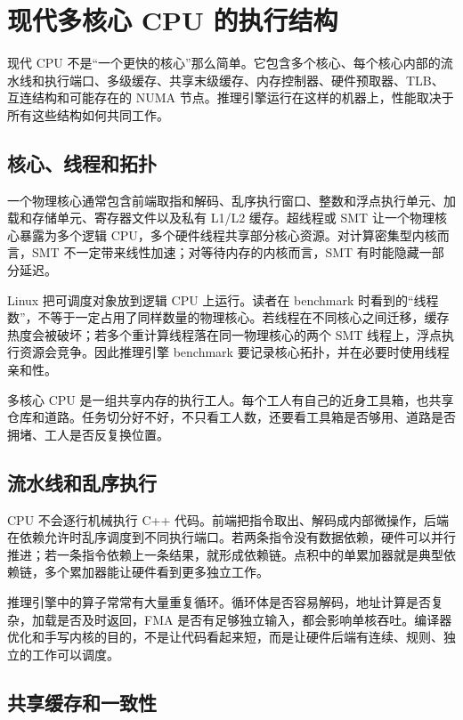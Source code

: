\chapter{现代多核心 CPU 的执行结构}

现代 CPU 不是“一个更快的核心”那么简单。它包含多个核心、每个核心内部的流水线和执行端口、多级缓存、共享末级缓存、内存控制器、硬件预取器、TLB、互连结构和可能存在的 NUMA 节点。推理引擎运行在这样的机器上，性能取决于所有这些结构如何共同工作。

\section{核心、线程和拓扑}

一个物理核心通常包含前端取指和解码、乱序执行窗口、整数和浮点执行单元、加载和存储单元、寄存器文件以及私有 L1/L2 缓存。超线程或 SMT 让一个物理核心暴露为多个逻辑 CPU，多个硬件线程共享部分核心资源。对计算密集型内核而言，SMT 不一定带来线性加速；对等待内存的内核而言，SMT 有时能隐藏一部分延迟。

Linux 把可调度对象放到逻辑 CPU 上运行。读者在 benchmark 时看到的“线程数”，不等于一定占用了同样数量的物理核心。若线程在不同核心之间迁移，缓存热度会被破坏；若多个重计算线程落在同一物理核心的两个 SMT 线程上，浮点执行资源会竞争。因此推理引擎 benchmark 要记录核心拓扑，并在必要时使用线程亲和性。

\begin{mentalmodel}
多核心 CPU 是一组共享内存的执行工人。每个工人有自己的近身工具箱，也共享仓库和道路。任务切分好不好，不只看工人数，还要看工具箱是否够用、道路是否拥堵、工人是否反复换位置。
\end{mentalmodel}

\section{流水线和乱序执行}

CPU 不会逐行机械执行 C++ 代码。前端把指令取出、解码成内部微操作，后端在依赖允许时乱序调度到不同执行端口。若两条指令没有数据依赖，硬件可以并行推进；若一条指令依赖上一条结果，就形成依赖链。点积中的单累加器就是典型依赖链，多个累加器能让硬件看到更多独立工作。

推理引擎中的算子常常有大量重复循环。循环体是否容易解码，地址计算是否复杂，加载是否及时返回，FMA 是否有足够独立输入，都会影响单核吞吐。编译器优化和手写内核的目的，不是让代码看起来短，而是让硬件后端有连续、规则、独立的工作可以调度。

\section{共享缓存和一致性}

